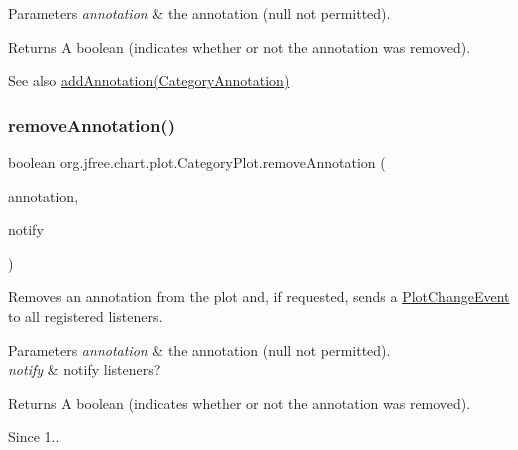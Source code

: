 \begin{DoxyParams}{Parameters}
{\em annotation} & the annotation ({\ttfamily null} not permitted).\\
\hline
\end{DoxyParams}
\begin{DoxyReturn}{Returns}
A boolean (indicates whether or not the annotation was removed).
\end{DoxyReturn}
\begin{DoxySeeAlso}{See also}
\mbox{\hyperlink{classorg_1_1jfree_1_1chart_1_1plot_1_1_category_plot_a2d0e34330e6184b16926794c8f43bf3d}{add\+Annotation(\+Category\+Annotation)}} 
\end{DoxySeeAlso}
\mbox{\label{classorg_1_1jfree_1_1chart_1_1plot_1_1_category_plot_a38dd23d3b64afd8fea74e11d2b53f5b6}} 
\subsubsection{\texorpdfstring{remove\+Annotation()}{removeAnnotation()}\hspace{0.1cm}{\footnotesize\ttfamily [2/2]}}
{\footnotesize\ttfamily boolean org.\+jfree.\+chart.\+plot.\+Category\+Plot.\+remove\+Annotation (\begin{DoxyParamCaption}\item[{\mbox{\hyperlink{interfaceorg_1_1jfree_1_1chart_1_1annotations_1_1_category_annotation}{Category\+Annotation}}}]{annotation,  }\item[{boolean}]{notify }\end{DoxyParamCaption})}

Removes an annotation from the plot and, if requested, sends a \mbox{\hyperlink{}{Plot\+Change\+Event}} to all registered listeners.


\begin{DoxyParams}{Parameters}
{\em annotation} & the annotation ({\ttfamily null} not permitted). \\
\hline
{\em notify} & notify listeners?\\
\hline
\end{DoxyParams}
\begin{DoxyReturn}{Returns}
A boolean (indicates whether or not the annotation was removed).
\end{DoxyReturn}
\begin{DoxySince}{Since}
1.. 
\end{DoxySince}
\mbox{\label{classorg_1_1jfree_1_1chart_1_1plot_1_1_category_plot_a2e59f00b94ab84347d6adc1a727399c0}} 
